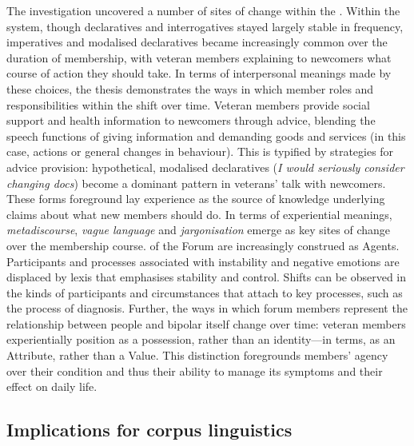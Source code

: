 The investigation uncovered a number of  sites of change within the . Within the  system, though declaratives and interrogatives stayed largely stable in frequency, imperatives and modalised declaratives became increasingly common over the duration of membership, with veteran \glspl{member} explaining to newcomers what course of action they should take. In terms of interpersonal meanings made by these  choices, the thesis demonstrates the ways in which member roles and responsibilities within the  shift over time. Veteran \glspl{member} provide social support and health information to newcomers through advice, blending the speech functions of giving information and demanding goods and services (in this case, actions or general changes in behaviour). This is typified by strategies for advice provision: hypothetical, modalised declaratives (\emph{I would seriously consider changing docs}) become a dominant pattern in veterans' talk with newcomers. These forms foreground lay experience as the source of knowledge underlying claims about what new \glspl{member} should do. In terms of experiential meanings, \emph{metadiscourse}, \emph{vague language} and \emph{jargonisation} emerge as key sites of change over the membership course.  of the \gls{Forum} are increasingly construed as Agents. Participants and processes associated with instability and negative emotions are displaced by lexis that emphasises stability and control. Shifts can be observed in the kinds of participants and circumstances that attach to key processes, such as the process of diagnosis. Further, the ways in which \gls{forum} \glspl{member} represent the relationship between people and \gls{bipolar} itself change over time: veteran \glspl{member} experientially position  as a possession, rather than an identity---in  terms, as an Attribute, rather than a Value. This distinction foregrounds \glspl{member}' agency over their condition and thus their ability to manage its symptoms and their effect on daily life.


\subsection{Implications for corpus linguistics}

